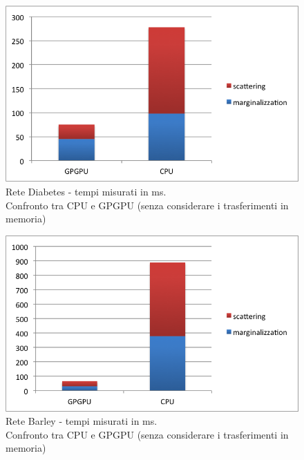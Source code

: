 \documentclass[a4paper]{article}   %
\begin{document}
\begin{figure}[p]
\centering
\includegraphics[scale=0.8]{Diabetes.png}
\caption{Rete Diabetes - tempi misurati in ms.\\Confronto tra CPU e GPGPU (senza considerare i trasferimenti in memoria)} 
\label{graficoDiabetes}
\end{figure}

\begin{figure}[p]
\centering
\includegraphics[scale=0.8]{Barley.png}
\caption{Rete Barley - tempi misurati in ms.\\Confronto tra CPU e GPGPU (senza considerare i trasferimenti in memoria)} 
\label{graficoBarley}
\end{figure}
\end{document}
